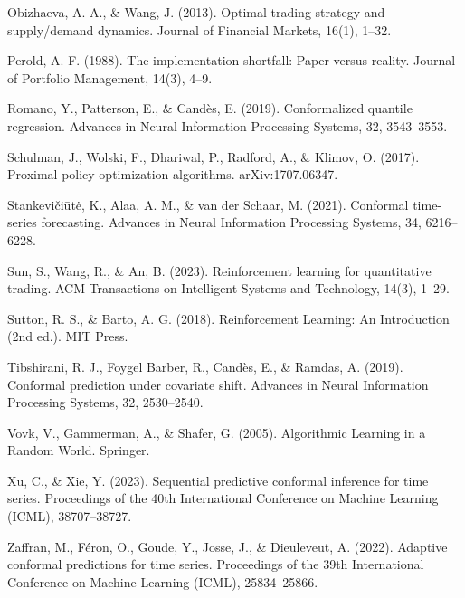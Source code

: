 Obizhaeva, A. A., \& Wang, J. (2013). Optimal trading strategy and
supply/demand dynamics. Journal of Financial Markets, 16(1), 1--32.

Perold, A. F. (1988). The implementation shortfall: Paper versus
reality. Journal of Portfolio Management, 14(3), 4--9.

Romano, Y., Patterson, E., \& Candès, E. (2019). Conformalized quantile
regression. Advances in Neural Information Processing Systems, 32,
3543--3553.

Schulman, J., Wolski, F., Dhariwal, P., Radford, A., \& Klimov, O.
(2017). Proximal policy optimization algorithms. arXiv:1707.06347.

Stankevičiūtė, K., Alaa, A. M., \& van der Schaar, M. (2021). Conformal
time-series forecasting. Advances in Neural Information Processing
Systems, 34, 6216--6228.

Sun, S., Wang, R., \& An, B. (2023). Reinforcement learning for
quantitative trading. ACM Transactions on Intelligent Systems and
Technology, 14(3), 1--29.

Sutton, R. S., \& Barto, A. G. (2018). Reinforcement Learning: An
Introduction (2nd ed.). MIT Press.

Tibshirani, R. J., Foygel Barber, R., Candès, E., \& Ramdas, A. (2019).
Conformal prediction under covariate shift. Advances in Neural
Information Processing Systems, 32, 2530--2540.

Vovk, V., Gammerman, A., \& Shafer, G. (2005). Algorithmic Learning in a
Random World. Springer.

Xu, C., \& Xie, Y. (2023). Sequential predictive conformal inference for
time series. Proceedings of the 40th International Conference on Machine
Learning (ICML), 38707--38727.

Zaffran, M., Féron, O., Goude, Y., Josse, J., \& Dieuleveut, A. (2022).
Adaptive conformal predictions for time series. Proceedings of the 39th
International Conference on Machine Learning (ICML), 25834--25866.
\endgroup
